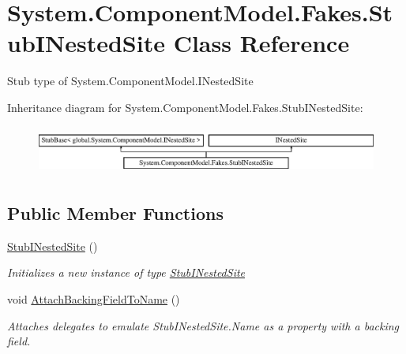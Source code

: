 \hypertarget{class_system_1_1_component_model_1_1_fakes_1_1_stub_i_nested_site}{\section{System.\-Component\-Model.\-Fakes.\-Stub\-I\-Nested\-Site Class Reference}
\label{class_system_1_1_component_model_1_1_fakes_1_1_stub_i_nested_site}
}


Stub type of System.\-Component\-Model.\-I\-Nested\-Site 


Inheritance diagram for System.\-Component\-Model.\-Fakes.\-Stub\-I\-Nested\-Site\-:\begin{figure}[H]
\begin{center}
\leavevmode
\includegraphics[height=1.627907cm]{class_system_1_1_component_model_1_1_fakes_1_1_stub_i_nested_site}
\end{center}
\end{figure}
\subsection*{Public Member Functions}
\begin{DoxyCompactItemize}
\item 
\hyperlink{class_system_1_1_component_model_1_1_fakes_1_1_stub_i_nested_site_a21e9ffa076a67c836810df4fb294bd92}{Stub\-I\-Nested\-Site} ()
\begin{DoxyCompactList}\small\item\em Initializes a new instance of type \hyperlink{class_system_1_1_component_model_1_1_fakes_1_1_stub_i_nested_site}{Stub\-I\-Nested\-Site}\end{DoxyCompactList}\item 
void \hyperlink{class_system_1_1_component_model_1_1_fakes_1_1_stub_i_nested_site_a337de08b4bbdb851b9eb285c6014a95e}{Attach\-Backing\-Field\-To\-Name} ()
\begin{DoxyCompactList}\small\item\em Attaches delegates to emulate Stub\-I\-Nested\-Site.\-Name as a property with a backing field.\end{DoxyCompactList}\end{DoxyCompactItemize}
